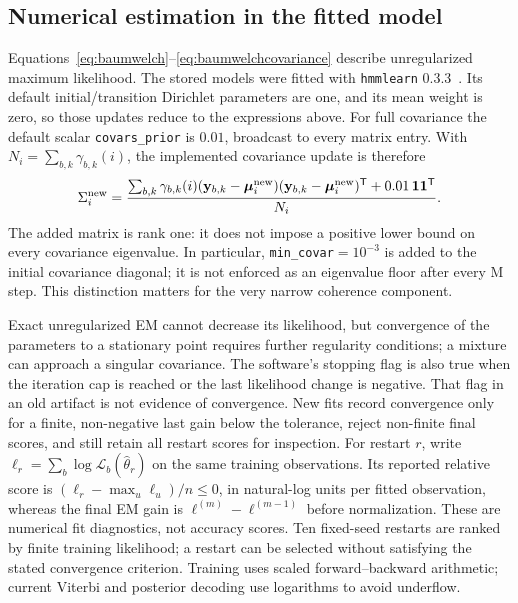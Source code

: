 \subsection{Numerical estimation in the fitted model}
\label{sec:hmmestimation}

Equations~\eqref{eq:baumwelch}--\eqref{eq:baumwelchcovariance} describe unregularized
maximum likelihood. The stored models were fitted with \texttt{hmmlearn} 0.3.3~\cite{hmmlearn033}. Its default initial/transition
Dirichlet parameters are one, and its mean weight is zero, so those updates reduce to
the expressions above. For full covariance the default scalar \texttt{covars\_prior}
is $0.01$, broadcast to every matrix entry. With $N_i=\sum_{b,k}\gamma_{b,k}(i)$,
the implemented covariance update is therefore
\begin{equation}
 \Sigma_i^{\rm new}
 =\frac{\sum_{b,k}\gamma_{b,k}(i)
    (\mathbf y_{b,k}-\boldsymbol\mu_i^{\rm new})
    (\mathbf y_{b,k}-\boldsymbol\mu_i^{\rm new})^{\mathsf T}
    +0.01\,\mathbf 1\mathbf 1^{\mathsf T}}{N_i}.
 \label{eq:hmmactualcovariance}
\end{equation}
The added matrix is rank one: it does not impose a positive lower bound on every
covariance eigenvalue. In particular, \texttt{min\_covar}$=10^{-3}$ is added to the
initial covariance diagonal; it is not enforced as an eigenvalue floor after every
M step. This distinction matters for the very narrow coherence component.

Exact unregularized EM cannot decrease its likelihood, but convergence of the
parameters to a stationary point requires further regularity conditions; a mixture
can approach a singular covariance. The software's stopping flag is also true when
the iteration cap is reached or the last likelihood change is negative. That flag in
an old artifact is not evidence of convergence. New fits record convergence only for
a finite, non-negative last gain below the tolerance, reject non-finite final scores,
and still retain all restart scores for inspection. For restart $r$, write $\ell_r=\sum_b\log\mathcal L_b(\widehat\theta_r)$ on the same
training observations. Its reported relative score is
$(\ell_r-\max_u\ell_u)/n\le0$, in natural-log units per fitted observation, whereas the
final EM gain is $\ell^{(m)}-\ell^{(m-1)}$ before normalization. These are numerical
fit diagnostics, not accuracy scores. Ten fixed-seed restarts are ranked
by finite training likelihood; a restart can be selected without satisfying the stated
convergence criterion. Training uses scaled forward--backward arithmetic; current
Viterbi and posterior decoding use logarithms to avoid underflow.


